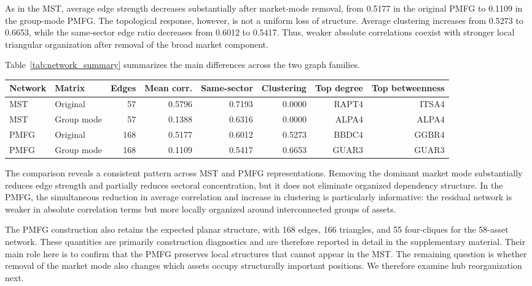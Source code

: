 As in the MST, average edge strength decreases substantially after market-mode removal, from 0.5177 in the original PMFG to 0.1109 in the group-mode PMFG. The topological response, however, is not a uniform loss of structure. Average clustering increases from 0.5273 to 0.6653, while the same-sector edge ratio decreases from 0.6012 to 0.5417. Thus, weaker absolute correlations coexist with stronger local triangular organization after removal of the broad market component.

Table~\ref{tab:network_summary} summarizes the main differences across the two graph families.

\begin{center}
\label{tab:network_summary}
\small
\setlength{\tabcolsep}{3.5pt}
\begin{tabular}{llrrrrrr}
\toprule
Network & Matrix & Edges & Mean corr. & Same-sector & Clustering & Top degree & Top betweenness \\
\midrule
MST & Original & 57 & 0.5796 & 0.7193 & 0.0000 & RAPT4 & ITSA4 \\
MST & Group mode & 57 & 0.1388 & 0.6316 & 0.0000 & ALPA4 & ALPA4 \\
PMFG & Original & 168 & 0.5177 & 0.6012 & 0.5273 & BBDC4 & GGBR4 \\
PMFG & Group mode & 168 & 0.1109 & 0.5417 & 0.6653 & GUAR3 & GUAR3 \\
\bottomrule
\end{tabular}
\end{center}


The comparison reveals a consistent pattern across MST and PMFG representations. Removing the dominant market mode substantially reduces edge strength and partially reduces sectoral concentration, but it does not eliminate organized dependency structure. In the PMFG, the simultaneous reduction in average correlation and increase in clustering is particularly informative: the residual network is weaker in absolute correlation terms but more locally organized around interconnected groups of assets.

The PMFG construction also retains the expected planar structure, with 168 edges, 166 triangles, and 55 four-cliques for the 58-asset network. These quantities are primarily construction diagnostics and are therefore reported in detail in the supplementary material. Their main role here is to confirm that the PMFG preserves local structures that cannot appear in the MST. The remaining question is whether removal of the market mode also changes which assets occupy structurally important positions. We therefore examine hub reorganization next.
